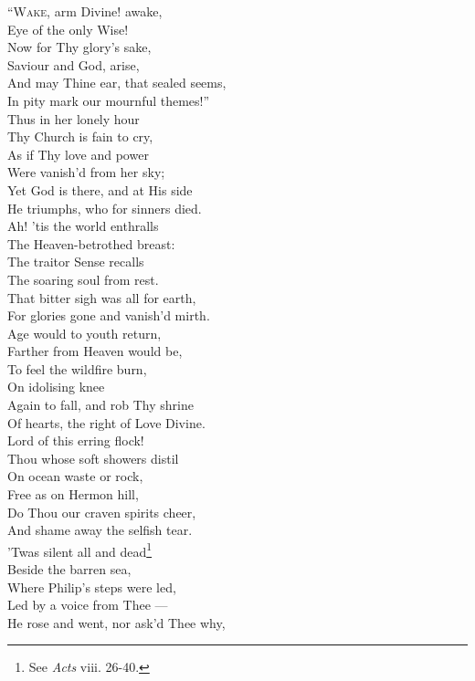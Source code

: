 “\textsc{Wake}, arm Divine! awake, \\
 Eye of the only Wise! \\
 Now for Thy glory’s sake, \\
 Saviour and God, arise, \\
 And may Thine ear, that sealed seems, \\
 In pity mark our mournful themes!” \\
  Thus in her lonely hour \\
 Thy Church is fain to cry, \\
 As if Thy love and power \\
 Were vanish’d from her sky; \\
 Yet God is there, and at His side \\
 He triumphs, who for sinners died. \\
  Ah! ’tis the world enthralls \\
 The Heaven-betrothed breast: \\
 The traitor Sense recalls \\
 The soaring soul from rest. \\
 That bitter sigh was all for earth, \\
 For glories gone and vanish’d mirth. \\
  Age would to youth return, \\
 Farther from Heaven would be, \\
 To feel the wildfire burn, \\
 On idolising knee \\
 Again to fall, and rob Thy shrine \\
 Of hearts, the right of Love Divine. \\
  Lord of this erring flock! \\
 Thou whose soft showers distil \\
 On ocean waste or rock, \\
 Free as on Hermon hill, \\
 Do Thou our craven spirits cheer, \\
 And shame away the selfish tear. \\
  ’Twas silent all and dead\footnote{See \emph{Acts} viii. 26-40.} \\
 Beside the barren sea, \\
 Where Philip’s steps were led, \\
 Led by a voice from Thee — \\
 He rose and went, nor ask’d Thee why, \\
